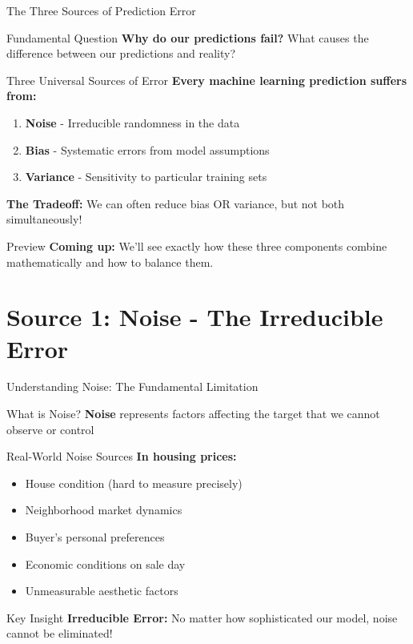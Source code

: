 \documentclass[10pt]{beamer}
\begin{document}
\begin{frame}{The Three Sources of Prediction Error}
\begin{alertbox}{Fundamental Question}
\textbf{Why do our predictions fail?} What causes the difference between our predictions and reality?
\end{alertbox}

\begin{definitionbox}{Three Universal Sources of Error}
\textbf{Every machine learning prediction suffers from:}
\begin{enumerate}
\item \textbf{Noise} - Irreducible randomness in the data
\item \textbf{Bias} - Systematic errors from model assumptions
\item \textbf{Variance} - Sensitivity to particular training sets
\end{enumerate}
\end{definitionbox}

\begin{keypointsbox}
\textbf{The Tradeoff:} We can often reduce bias OR variance, but not both simultaneously!
\end{keypointsbox}

\begin{examplebox}{Preview}
\textbf{Coming up:} We'll see exactly how these three components combine mathematically and how to balance them.
\end{examplebox}
\end{frame}

\section{Source 1: Noise - The Irreducible Error}

\begin{frame}{Understanding Noise: The Fundamental Limitation}
\begin{definitionbox}{What is Noise?}
\textbf{Noise} represents factors affecting the target that we cannot observe or control
\end{definitionbox}

\begin{examplebox}{Real-World Noise Sources}
\textbf{In housing prices:}
\begin{itemize}
\item House condition (hard to measure precisely)
\item Neighborhood market dynamics
\item Buyer's personal preferences
\item Economic conditions on sale day
\item Unmeasurable aesthetic factors
\end{itemize}
\end{examplebox}

\begin{alertbox}{Key Insight}
\textbf{Irreducible Error:} No matter how sophisticated our model, noise cannot be eliminated!
\end{alertbox}
\end{frame}
\end{document}
